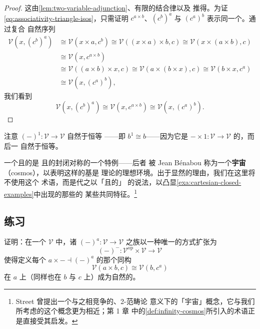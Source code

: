 \begin{proof}
这由\cref{lem:two-variable-adjunction}、有限\trProduct{}的结合律以及%
\trYonedaLemma{}推得。为证 \eqref{eq:associativity-triangle-isos}，只需证明
$c^{a\times b}$、$(c^{b})^{a}$ 与 $(c^{a})^{b}$ 表示同一个\trFunctor。通过复合
自然\trIsomorphism{}序列
\begin{align*}
\mathcal{V}(x,(c^{b})^{a})
  &\cong\mathcal{V}(x\times a,c^{b})
    \cong\mathcal{V}((x\times a)\times b,c)
    \cong\mathcal{V}(x\times(a\times b),c)\\
  &\cong\mathcal{V}(x,c^{a\times b})\\
  &\cong\mathcal{V}((a\times b)\times x,c)
    \cong\mathcal{V}(a\times(b\times x),c)
    \cong\mathcal{V}(b\times x,c^{a})\\
  &\cong\mathcal{V}(x,(c^{a})^{b}),
\end{align*}
我们看到
\[ \mathcal{V}(x,(c^{b})^{a})\cong\mathcal{V}(x,c^{a\times b})
   \cong\mathcal{V}(x,(c^{a})^{b}). \]
\end{proof}

\begin{remark}\label{rem:exponent-one-identity}
注意 $(-)^{1}\colon\mathcal{V}\to\mathcal{V}$ 自然\trIsomorphism{}于恒等%
\trFunctor{}——即 $b^{1}\cong b$——因为它是\trFunctor{}
$-\times1\colon\mathcal{V}\to\mathcal{V}$ 的\trRightAdjoint，而后一\trFunctor{}%
自然\trIsomorphism{}于恒等。
\end{remark}

一个\trComplete{}且\trCocomplete{}的\trCartesianClosed{}\trCategory{}是%
\trComplete{}且\trCocomplete{}的封闭对称\trMonoidalCategory{}的一个特例——后者
被 Jean Bénabou 称为一个\textbf{宇宙}（cosmos），以表明这样的基是%
\trEnrichedCategory{}理论的理想环境。出于显然的理由，我们在这里将不使用这个
术语，而是代之以「\trComplete{}且\trCocomplete{}的\trCartesianClosed{}\trCategory」
的说法，以凸显\cref{exa:cartesian-closed-examples}中出现的那些\trCategory{}的
某些共同特征。\footnote{Street \cite{bib117} 曾提出一个与之相竞争的、2-范畴论
意义下的\trFibered{}「宇宙」概念，它与我们所考虑的这个概念更为相近；第 1 章
中的\cref{def:infinity-cosmos}所引入的术语正是直接受其启发。}

\subsection*{练习}

\begin{exercise}\label{ex:extend-to-bifunctors}
证明：在一个\trCartesianClosed{}\trCategory{} $\mathcal{V}$ 中，诸\trFunctor{}
$(-)^{a}\colon\mathcal{V}\to\mathcal{V}$ 之族以一种唯一的方式扩张为\trBifunctor
\[ (-)^{-}\colon\mathcal{V}^{\mathrm{op}}\times\mathcal{V}\to\mathcal{V} \]
使得定义每个\trAdjunction{} $a\times-\dashv(-)^{a}$ 的那个同构
\[ \mathcal{V}(a\times b,c)\cong\mathcal{V}(b,c^{a}) \]
在 $a$ 上（同样也在 $b$ 与 $c$ 上）成为自然的。
\end{exercise}


